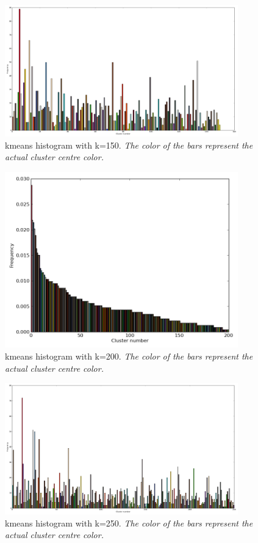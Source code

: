 \documentclass[10pt,twocolumn,letterpaper]{article}
\begin{document}
\begin{figure}[p]
  \centering
  \includegraphics[width=0.90\textwidth]{../150_histogram.png}
  \caption{kmeans histogram with k=150. \emph{The color of the bars
represent the actual cluster centre color.}}
  \label{k-150}
\end{figure}

\begin{figure}[p]
  \centering
  \includegraphics[width=0.90\textwidth]{../200_histogram_sorted.png}
  \caption{kmeans histogram with k=200. \emph{The color of the bars
represent the actual cluster centre color.}}
  \label{k-200}
\end{figure}

\begin{figure}[p]
  \centering
  \includegraphics[width=0.90\textwidth]{../250_histogram.png}
  \caption{kmeans histogram with k=250. \emph{The color of the bars
represent the actual cluster centre color.}}
  \label{k-250}
\end{figure}
\end{document}
